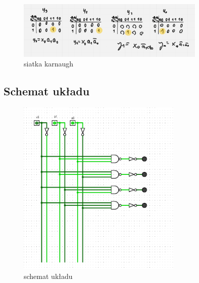 \begin{figure}[h!]
    \centering
    \includegraphics[width=0.8\textwidth]{images/dmux/dmux_k.png}
    \caption{siatka karnaugh}
    \label{fig:my_label}
\end{figure}

\subsection{Schemat układu}

\begin{figure}[h!]
    \centering
    \includegraphics[width=0.7\textwidth]{images/dmux/dmux_l.png}
    \caption{schemat układu}
    \label{fig:my_label}
\end{figure}